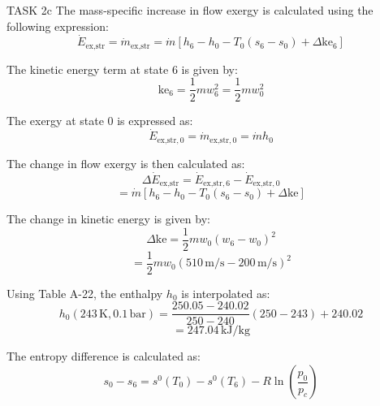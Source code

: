 TASK 2c  
The mass-specific increase in flow exergy is calculated using the following expression:  
\[
\dot{E}_{\text{ex,str}} = \dot{m}_{\text{ex,str}} = \dot{m} \left[ h_6 - h_0 - T_0 (s_6 - s_0) + \Delta \text{ke}_6 \right]
\]  

The kinetic energy term at state 6 is given by:  
\[
\text{ke}_6 = \frac{1}{2} m w_6^2 = \frac{1}{2} m w_0^2
\]  

The exergy at state 0 is expressed as:  
\[
\dot{E}_{\text{ex,str},0} = \dot{m}_{\text{ex,str},0} = \dot{m} h_0
\]  

The change in flow exergy is then calculated as:  
\[
\Delta \dot{E}_{\text{ex,str}} = \dot{E}_{\text{ex,str},6} - \dot{E}_{\text{ex,str},0}
\]  
\[
= \dot{m} \left[ h_6 - h_0 - T_0 (s_6 - s_0) + \Delta \text{ke} \right]
\]  

The change in kinetic energy is given by:  
\[
\Delta \text{ke} = \frac{1}{2} m w_0 \left( w_6 - w_0 \right)^2
\]  
\[
= \frac{1}{2} m w_0 \left( 510 \, \text{m/s} - 200 \, \text{m/s} \right)^2
\]  

Using Table A-22, the enthalpy \( h_0 \) is interpolated as:  
\[
h_0 (243 \, \text{K}, 0.1 \, \text{bar}) = \frac{250.05 - 240.02}{250 - 240} (250 - 243) + 240.02
\]  
\[
= 247.04 \, \text{kJ/kg}
\]  

The entropy difference is calculated as:  
\[
s_0 - s_6 = s^0(T_0) - s^0(T_6) - R \ln \left( \frac{p_0}{p_c} \right)
\]